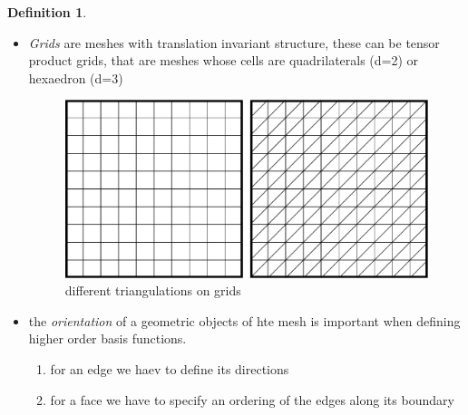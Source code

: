 \documentclass[english]{article}
\theoremstyle{definition}
\newtheorem*{defi}{Definition}
\theoremstyle{remark}
\begin{document}
\begin{defi}
\begin{itemize}
  \item \emph{Grids} are meshes with translation invariant structure, these can be tensor product grids, that are meshes whose cells are quadrilaterals (d=2) or hexaedron (d=3)
    \begin{figure}[tbh]
      \begin{center}
        \includegraphics[width=\textwidth]{figs/grids.pdf}
      \end{center}
      \caption{different triangulations on grids}
      \label{grids-figure}
    \end{figure}
  \item the \emph{orientation} of a geometric objects of hte mesh is important when defining higher order basis functions.
    \begin{enumerate}
    \item for an edge we haev to define its directions
    \item for a face we have to specify an ordering of the edges along its boundary
      
    \end{enumerate}

  \end{itemize}
\end{defi}
\end{document}
